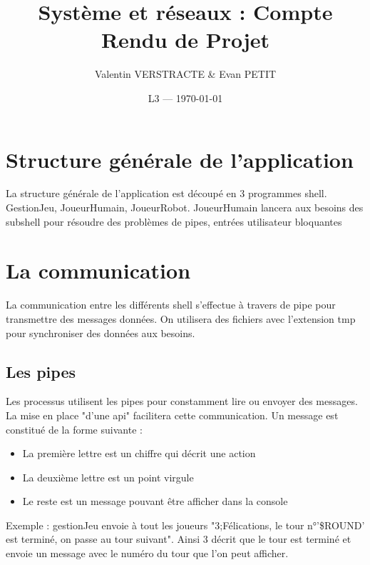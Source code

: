 \documentclass{article}
\title{Système et réseaux : Compte Rendu de Projet} %
\author{Valentin VERSTRACTE \& Evan PETIT}
\date{L3 --- \today} %
\begin{document}
\maketitle %



\section{Structure générale de l'application}
La structure générale de l'application est découpé en 3 programmes shell. GestionJeu, JoueurHumain, JoueurRobot. JoueurHumain lancera aux besoins des subshell pour résoudre des problèmes de pipes, entrées utilisateur bloquantes

\section{La communication}
La communication entre les différents shell s'effectue à travers de pipe pour transmettre des messages données. On utilisera des fichiers avec l'extension tmp pour synchroniser des données aux besoins. 

\subsection{Les pipes}
Les processus utilisent les pipes pour constamment lire ou envoyer des messages. La mise en place "d'une api" facilitera cette communication. Un message est constitué de la forme suivante :

\begin{itemize}
\item La première lettre est un chiffre qui décrit une action  
\item La deuxième lettre est un point virgule
\item Le reste est un message pouvant être afficher dans la console 
\end{itemize}

Exemple : gestionJeu envoie à tout les joueurs "3;Félications, le tour n°'\$ROUND' est terminé, on passe au tour suivant". Ainsi 3 décrit que le tour est terminé et envoie un message avec le numéro du tour que l'on peut afficher. 
\end{document}
